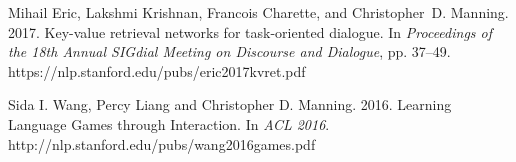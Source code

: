 \documentclass[11pt,letterpaper]{article}
\def\url#1{{\small\sf #1}}
\begin{document}
\begin{vita}
\begin{Products (most closely related)}
\item Mihail Eric, Lakshmi Krishnan, Francois Charette, and Christopher~D. Manning.
2017.
Key-value retrieval networks for task-oriented dialogue.
In {\em Proceedings of the 18th Annual SIGdial Meeting on Discourse and Dialogue}, pp. 37--49.
\url{https://nlp.stanford.edu/pubs/eric2017kvret.pdf}


\item Sida I. Wang, Percy Liang and Christopher D. Manning. 2016.
Learning Language Games through Interaction.
In \emph{ACL 2016}. 
\url{http://nlp.stanford.edu/pubs/wang2016games.pdf}







\end{Products (most closely related)}
\end{vita}
\end{document}
